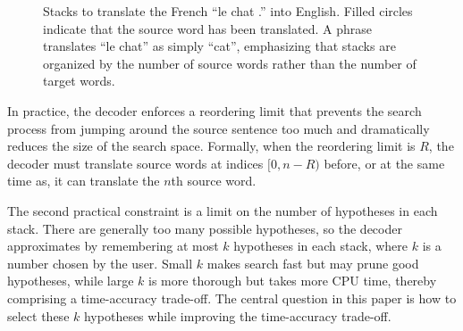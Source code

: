 \documentclass[11pt]{article}
\begin{document}
\begin{figure}\small%
\caption{\label{stacks}Stacks to translate the French ``le chat .'' into English.  Filled circles indicate that the source word has been translated.  A phrase translates ``le chat'' as simply ``cat'', emphasizing that stacks are organized by the number of source words rather than the number of target words.}
\end{figure}

In practice, the decoder enforces a reordering limit that prevents the search process from jumping around the source sentence too much and dramatically reduces the size of the search space.  Formally, when the reordering limit is $R$, the decoder must translate source words at indices $[0,n-R)$ before, or at the same time as, it can translate the $n$th source word.  

The second practical constraint is a limit on the number of hypotheses in each stack.  There are generally too many possible hypotheses, so the decoder approximates by remembering at most $k$ hypotheses in each stack, where $k$ is a number chosen by the user.  Small $k$ makes search fast but may prune good hypotheses, while large $k$ is more thorough but takes more CPU time, thereby comprising a time-accuracy trade-off.  The central question in this paper is how to select these $k$ hypotheses while improving the time-accuracy trade-off.  
\end{document}
